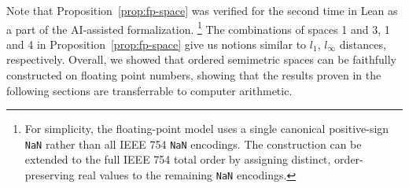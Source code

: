 Note that Proposition~\ref{prop:fp-space} was verified for the second time in Lean as a part of the AI-assisted formalization. \footnote{For simplicity, the floating-point model uses a single canonical positive-sign \texttt{NaN} rather than all IEEE 754 \texttt{NaN} encodings. The construction can be extended to the full IEEE 754 total order by assigning distinct, order-preserving real values to the remaining \texttt{NaN} encodings.} The combinations of spaces 1 and 3, 1 and 4 in Proposition~\ref{prop:fp-space} give us notions similar to $l_1$, $l_\infty$ distances, respectively. Overall, we showed that ordered semimetric spaces can be faithfully constructed on floating point numbers, showing that the results proven in the following sections are transferrable to computer arithmetic.
